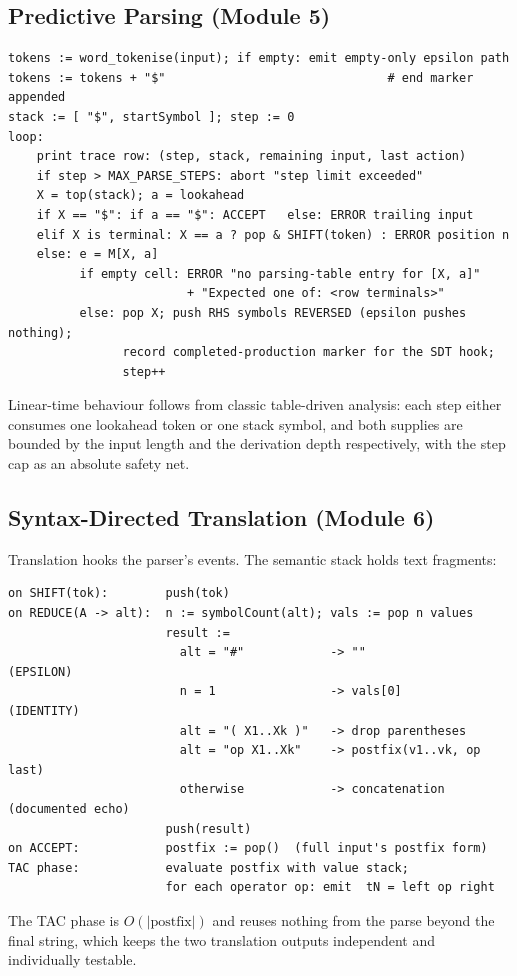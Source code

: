 \documentclass[12pt,a4paper,oneside,openany]{report}
\begin{document}
\subsection{Predictive Parsing (Module 5)}
\begin{lstlisting}[style=cfg,label=lst:parser,caption={Table-driven predictive parse (abridged)}]
tokens := word_tokenise(input); if empty: emit empty-only epsilon path
tokens := tokens + "$"                               # end marker appended
stack := [ "$", startSymbol ]; step := 0
loop:
    print trace row: (step, stack, remaining input, last action)
    if step > MAX_PARSE_STEPS: abort "step limit exceeded"
    X = top(stack); a = lookahead
    if X == "$": if a == "$": ACCEPT   else: ERROR trailing input
    elif X is terminal: X == a ? pop & SHIFT(token) : ERROR position n
    else: e = M[X, a]
          if empty cell: ERROR "no parsing-table entry for [X, a]"
                         + "Expected one of: <row terminals>"
          else: pop X; push RHS symbols REVERSED (epsilon pushes nothing);
                record completed-production marker for the SDT hook;
                step++
\end{lstlisting}
Linear-time behaviour follows from classic table-driven analysis: each
step either consumes one lookahead token or one stack symbol, and both
supplies are bounded by the input length and the derivation depth
respectively, with the step cap as an absolute safety net.

\subsection{Syntax-Directed Translation (Module 6)}
Translation hooks the parser's events. The semantic stack holds text
fragments:
\begin{lstlisting}[style=cfg,label=lst:sdt,caption={Event-driven translation (abridged)}]
on SHIFT(tok):        push(tok)
on REDUCE(A -> alt):  n := symbolCount(alt); vals := pop n values
                      result :=
                        alt = "#"            -> ""            (EPSILON)
                        n = 1                -> vals[0]       (IDENTITY)
                        alt = "( X1..Xk )"   -> drop parentheses
                        alt = "op X1..Xk"    -> postfix(v1..vk, op last)
                        otherwise            -> concatenation (documented echo)
                      push(result)
on ACCEPT:            postfix := pop()  (full input's postfix form)
TAC phase:            evaluate postfix with value stack;
                      for each operator op: emit  tN = left op right
\end{lstlisting}
The TAC phase is $O(|\text{postfix}|)$ and reuses nothing from the parse
beyond the final string, which keeps the two translation outputs
independent and individually testable.
\end{document}
